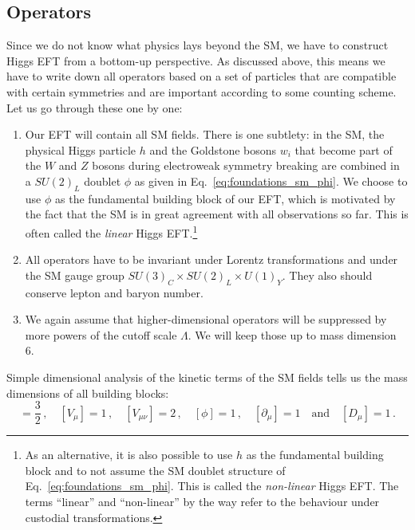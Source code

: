 \subsection{Operators}
\label{sec:HEFT_operators}

Since we do not know what physics lays beyond the SM, we have to
construct Higgs EFT from a bottom-up perspective. As discussed above,
this means we have to write down all operators based on a set of
particles that are compatible with certain symmetries and are
important according to some counting scheme. Let us go through these
one by one:
%
\begin{enumerate}
\item Our EFT will contain all SM fields. There is one subtlety: in
  the SM, the physical Higgs particle $h$ and the Goldstone bosons
  $w_i$ that become part of the $W$ and $Z$ bosons during electroweak
  symmetry breaking are combined in a $SU(2)_L$ doublet $\phi$ as
  given in Eq.~\eqref{eq:foundations_sm_phi}. We choose to use $\phi$ as the
  fundamental building block of our EFT, which is motivated by the
  fact that the SM is in great agreement with all observations so
  far. This is often called the \emph{linear} Higgs EFT.\footnote{As
    an alternative, it is also possible to use $h$ as the fundamental
    building block and to not assume the SM doublet structure of
    Eq.~\eqref{eq:foundations_sm_phi}. This is called the \emph{non-linear}
    Higgs EFT. The terms ``linear'' and ``non-linear'' by the way
    refer to the behaviour under custodial transformations.}
\item All operators have to be invariant under Lorentz transformations
  and under the SM gauge group $SU(3)_C \times SU(2)_L \times
  U(1)_Y$. They also should conserve lepton and baryon number.
\item We again assume that higher-dimensional operators will be
  suppressed by more powers of the cutoff scale $\Lambda$. We will
  keep those up to mass dimension 6.
\end{enumerate}
%
Simple dimensional analysis of the kinetic terms of the SM fields
tells us the mass dimensions of all building blocks:
%
\begin{equation}
  [f] = \frac 3 2\,, \quad [V_\mu] = 1 \,, \quad [V_{\mu \nu}] = 2 \,, \quad [\phi] = 1 \,, \quad [\partial_\mu] = 1 \quad \text{and} \quad [D_\mu] = 1 \,.
\end{equation}


